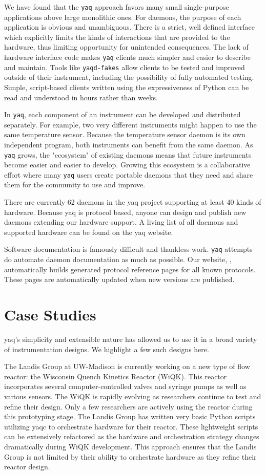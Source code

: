 \documentclass[aip, amsmath, amssymb, reprint,]{revtex4-1}
\newcommand\yaq{\texttt{yaq}}
\begin{document}
We have found that the \yaq{} approach favors many small single-purpose applications above large monolithic ones.
For daemons, the purpose of each application is obvious and unambiguous. 
There is a strict, well defined interface which explicitly limits the kinds of interactions that are provided to the hardware, thus limiting opportunity for unintended consequences.
The lack of hardware interface code makes \yaq{} clients much simpler and easier to describe and maintain.
Tools like \texttt{yaqd-fakes} allow clients to be tested and improved outside of their instrument, including the possibility of fully automated testing\cite{}.
Simple, script-based clients written using the expressiveness of Python can be read and understood in hours rather than weeks.

In \yaq{}, each component of an instrument can be developed and distributed separately.
For example, two very different instruments might happen to use the same temperature sensor.
Because the temperature sensor daemon is its own independent program, both instruments can benefit from the same daemon.
As \yaq{} grows, the "ecosystem" of existing daemons means that future instruments become easier and easier to develop.
Growing this ecosystem is a collaborative effort where many \yaq{} users create portable daemons that they need and share them for the community to use and improve.

There are currently 62 daemons in the yaq project supporting at least 40 kinds of hardware.
Because yaq is protocol based, anyone can design and publish new daemons extending our hardware support.
A living list of all daemons and supported hardware can be found on the yaq website.

Software documentation is famously difficult and thankless work.
\yaq{} attempts do automate daemon documentation as much as possible.
Our website, \href{https://yaq.fyi}, automatically builds generated protocol reference pages for all known protocols.
These pages are automatically updated when new versions are published.


\section{Case Studies}

yaq's simplicity and extensible nature has allowed us to use it in a broad variety of instrumentation designs.
We highlight a few such designs here.

The Landis Group at UW-Madison is currently working on a new type of flow reactor: the Wisconsin Quench Kinetics Reactor (WiQK).
This reactor incorporates several computer-controlled valves and syringe pumps as well as various sensors.
The WiQK is rapidly evolving as researchers continue to test and refine their design.
Only a few researchers are actively using the reactor during this prototyping stage.
The Landis Group has written very basic Python scripts utilizing yaqc to orchestrate hardware for their reactor.
These lightweight scripts can be extensively refactored as the hardware and orchestration strategy changes dramatically during WiQK development.
This approach ensures that the Landis Group is not limited by their ability to orchestrate hardware as they refine their reactor design.
\end{document}
